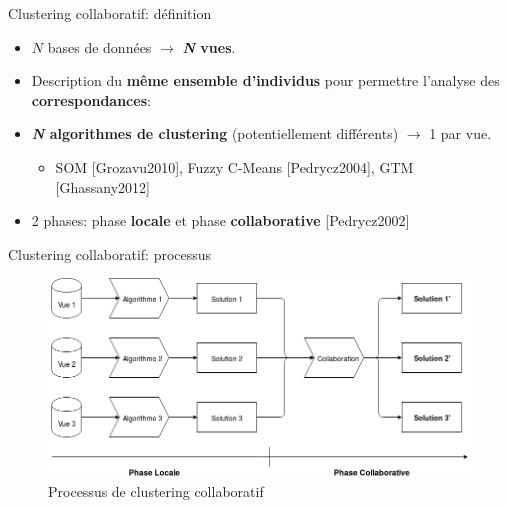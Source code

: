 \documentclass[hyperref={pdfpagelabels=false}]{beamer}
\begin{document}
    \begin{frame}{Clustering collaboratif: définition}
        \begin{itemize}
            \item<+-> $N$ bases de données $\rightarrow$ \textbf{\textit{N} 
                vues}.
            \item<+-> Description du \textbf{même ensemble d'individus} pour 
                permettre l'analyse des \textbf{correspondances}:
            \item<+-> \textbf{\textit{N} algorithmes de clustering} 
                (potentiellement différents)
                $\rightarrow$ 1 par vue.
                \begin{itemize}
                    \item SOM [Grozavu2010], Fuzzy C-Means [Pedrycz2004], GTM
                        [Ghassany2012]
                \end{itemize}
            \item<+-> 2 phases: phase \textbf{locale} et phase 
                \textbf{collaborative} [Pedrycz2002]
        \end{itemize}

    \end{frame}

    \begin{frame}{Clustering collaboratif: processus}
        \begin{figure}[b]
            \centering
            \includegraphics[scale=.35]{cc_resume}
            \caption{Processus de clustering collaboratif}
        \end{figure}
    \end{frame}
\end{document}
